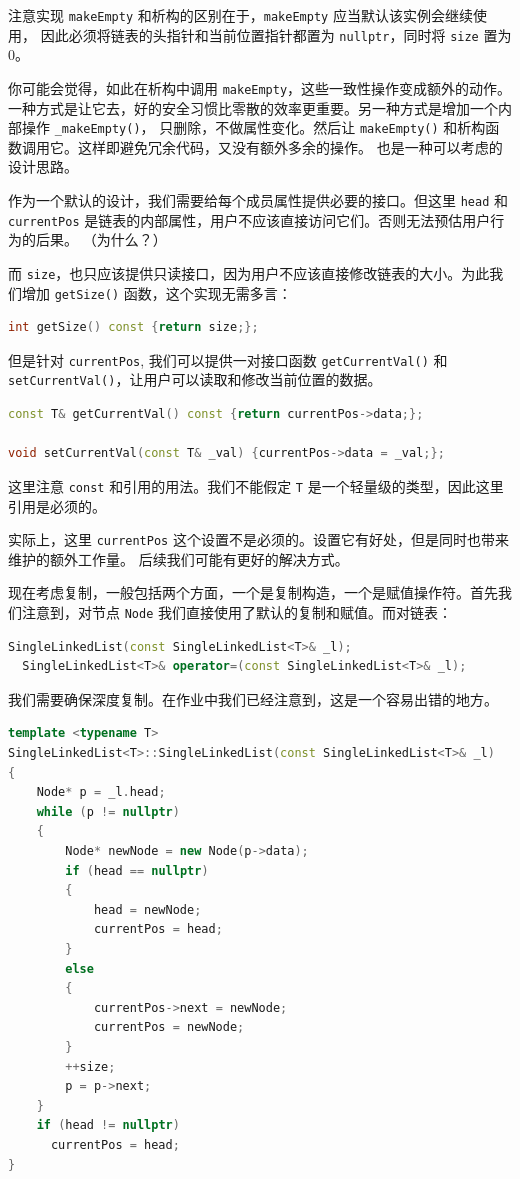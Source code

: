 \documentclass[a4paper]{ctexart}
\theoremstyle{definition}
\theoremstyle{definition}
\begin{document}
注意实现 \verb|makeEmpty| 和析构的区别在于，\verb|makeEmpty| 应当默认该实例会继续使用，
因此必须将链表的头指针和当前位置指针都置为 \verb|nullptr|，同时将 \verb|size| 置为 0。

你可能会觉得，如此在析构中调用 \verb|makeEmpty|，这些一致性操作变成额外的动作。
一种方式是让它去，好的安全习惯比零散的效率更重要。另一种方式是增加一个内部操作 \verb|_makeEmpty()|，
只删除，不做属性变化。然后让 \verb|makeEmpty()| 和析构函数调用它。这样即避免冗余代码，又没有额外多余的操作。
也是一种可以考虑的设计思路。
  
作为一个默认的设计，我们需要给每个成员属性提供必要的接口。但这里 
\verb|head| 和 \verb|currentPos| 是链表的内部属性，用户不应该直接访问它们。否则无法预估用户行为的后果。
（为什么？）

而 \verb|size|，也只应该提供只读接口，因为用户不应该直接修改链表的大小。为此我们增加 \verb|getSize()| 函数，这个实现无需多言：
\begin{lstlisting}[language=C++]
int getSize() const {return size;};
\end{lstlisting}

但是针对 \verb|currentPos|, 我们可以提供一对接口函数 \verb|getCurrentVal()| 和 \verb|setCurrentVal()|，让用户可以读取和修改当前位置的数据。

\begin{lstlisting}[language=C++]
const T& getCurrentVal() const {return currentPos->data;};

void setCurrentVal(const T& _val) {currentPos->data = _val;};
\end{lstlisting}

这里注意 \verb|const| 和引用的用法。我们不能假定 \verb|T| 是一个轻量级的类型，因此这里引用是必须的。

实际上，这里 \verb|currentPos| 这个设置不是必须的。设置它有好处，但是同时也带来维护的额外工作量。
后续我们可能有更好的解决方式。

现在考虑复制，一般包括两个方面，一个是复制构造，一个是赋值操作符。首先我们注意到，对节点 \verb|Node|
我们直接使用了默认的复制和赋值。而对链表：

\begin{lstlisting}[language=C++]
  SingleLinkedList(const SingleLinkedList<T>& _l);
  SingleLinkedList<T>& operator=(const SingleLinkedList<T>& _l);
\end{lstlisting}

我们需要确保深度复制。在作业中我们已经注意到，这是一个容易出错的地方。

\begin{lstlisting}[language=C++]
template <typename T>
SingleLinkedList<T>::SingleLinkedList(const SingleLinkedList<T>& _l)
{
    Node* p = _l.head;
    while (p != nullptr)
    {
        Node* newNode = new Node(p->data);
        if (head == nullptr)
        {
            head = newNode;
            currentPos = head;
        }
        else
        {
            currentPos->next = newNode;
            currentPos = newNode;
        }
        ++size;
        p = p->next;
    }
    if (head != nullptr)
      currentPos = head;
}
\end{lstlisting}
\end{document}

